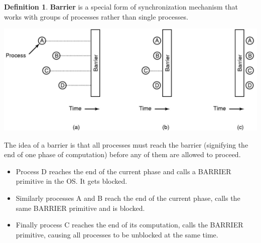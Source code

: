 \documentclass[11pt,a4paper]{article}
\theoremstyle{definition}
\newtheorem{definition}{Definition}[section]
\newenvironment{myitemize}
{ \begin{itemize}
    \setlength{\itemsep}{5pt}
    \setlength{\parskip}{0pt}
    \setlength{\parsep}{0pt}     }
{ \end{itemize}                  }
\begin{document}
\begin{definition}{\textbf{Barrier}}
	is a special form of synchronization mechanism that works with groups of processes rather than single processes.
	\begin{center}
		\includegraphics[scale=0.5]{m1/barrier}
	\end{center}
	
	The idea of a barrier is that all processes must reach the barrier (signifying the end of one phase of computation) before any of them are allowed to proceed.
	\begin{myitemize}
		\item Process D reaches the end of the current phase and calls a BARRIER primitive in the OS. It gets blocked.
		\item Similarly processes A and B reach the end of the current phase, calls the same BARRIER primitive and is blocked.
		\item Finally process C reaches the end of its computation, calls the BARRIER primitive, causing all processes to be unblocked at the same time.
	\end{myitemize}
\end{definition}
\end{document}
